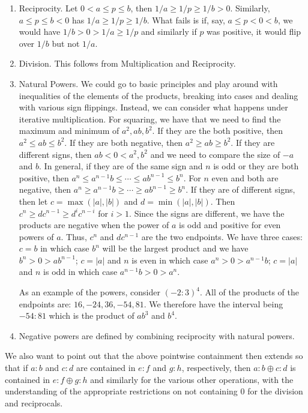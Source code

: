 \documentclass[12pt]{article}
\theoremstyle{remark}
\begin{document}
\begin{enumerate}
    \item Reciprocity. Let $0 < a \leq p \leq b$, then $1/a \geq 1/p  \geq 1/b > 0$. Similarly, $a \leq p \leq b< 0$ has $1/a \geq 1/p \geq 1/b$. What fails is if, say,  $a \leq p < 0 < b$, we would have $1/b > 0 > 1/a \geq 1/p $ and similarly if $p$ was positive, it would flip over $1/b$ but not $1/a$.
    \item Division. This follows from Multiplication and Reciprocity. 
    \item\label{natpow} Natural Powers. We could go to basic principles and play around with inequalities of the elements of the products, breaking into cases and dealing with various sign flippings. Instead, we can consider what happens under iterative multiplication. For squaring, we have that we need to find the maximum and minimum of $a^2, ab, b^2$. If they are the both positive, then $a^2 \leq ab \leq b^2$. If they are both negative, then $a ^2 \geq ab \geq b^2$. If they are different signs, then $ab < 0 < a^2, b^2$ and we need to compare the size of $-a$ and $b$.  In general, if they are of the same sign and $n$ is odd or they are both positive, then $a^n \leq a^{n-1} b \leq \cdots \leq ab^{n-1} \leq b^n$. For $n$ even and both are negative, then $a^n \geq a^{n-1} b \geq \cdots \geq ab^{n-1} \geq b^n$. If they are of different signs, then let $c = \max( |a|, |b|)$ and $d=\min(|a|, |b|)$. Then  $c^n \geq d c^{n-1} \geq d^{i}c^{n-i}$  for $i > 1$.  Since the signs are different, we have the products are negative when the power of $a$ is odd and positive for even powers of $a$. Thus, $c^n$ and $d c^{n-1}$ are the two endpoints. We have three cases: $c=b$ in which case $b^n$ will be the largest product and we have $b^n > 0 > ab^{n-1}$; $c=|a|$ and $n$ is even in which case $a^n > 0 > a^{n-1} b$; $c=|a|$ and $n$ is odd in which case $a^{n-1} b > 0 > a^n$.  

    As an example of the powers, consider $(-2:3)^4$. All of the products of the endpoints are: $16, -24, 36, -54, 81$. We therefore have the interval being $-54:81$ which is the product of $ab^3$ and $b^4$. 
     
    \item Negative powers are defined by combining reciprocity with natural powers. 
\end{enumerate}


We also want to point out that the above pointwise containment then extends so that if $a:b$ and $c:d$ are contained in $e:f$ and $g:h$, respectively, then $a:b \oplus c:d $ is contained in $e:f \oplus g:h$ and similarly for the various other operations, with the understanding of the appropriate restrictions on not containing 0 for the division and reciprocals. 
\end{document}
